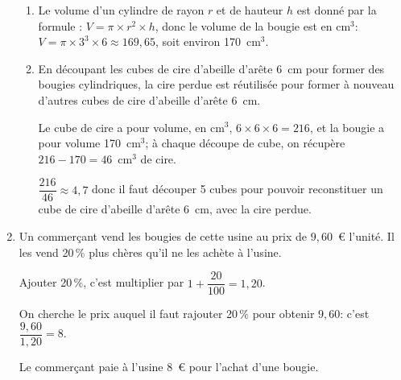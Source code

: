 \begin{enumerate}
\medskip

	\begin{enumerate}
		\item 
Le volume d'un cylindre de rayon $r$ et de hauteur $h$ est donné par la formule : 
$V = \pi \times  r^2 \times h$,
donc le volume de la bougie est en cm$^3$:
$V=\pi \times 3^3\times 6 \approx 169,65$,
soit environ 170~cm$^3$.
		\item En découpant les cubes de cire d'abeille d'arête 6~cm pour former des bougies cylindriques, la cire perdue est réutilisée pour former à nouveau d'autres cubes de cire d'abeille d'arête 6~cm. 

Le cube de cire a pour volume, en cm$^3$, $6\times 6\times 6=216$, et la bougie a pour volume 170~cm$^3$; à chaque découpe de cube, on récupère $216-170=46$~cm$^3$ de cire.

$\dfrac{216}{46}\approx 4,7$ donc il faut découper 5 cubes pour pouvoir reconstituer un cube de cire d'abeille d'arête 6~cm, avec la cire perdue.
		
	\end{enumerate}
	
\item Un commerçant vend les bougies de cette usine au prix de $9,60$~\euro{} l'unité. Il les vend 20\,\% plus chères qu'il ne les achète à l'usine.

Ajouter 20\,\%, c'est multiplier par $1+\dfrac{20}{100}=1,20$. 

On cherche le prix auquel il faut rajouter 20\,\% pour obtenir $9,60$: c'est $\dfrac{9,60}{1,20}=8$.

Le commerçant paie à l'usine 8~\euro{} pour l'achat d'une bougie.
\end{enumerate}

